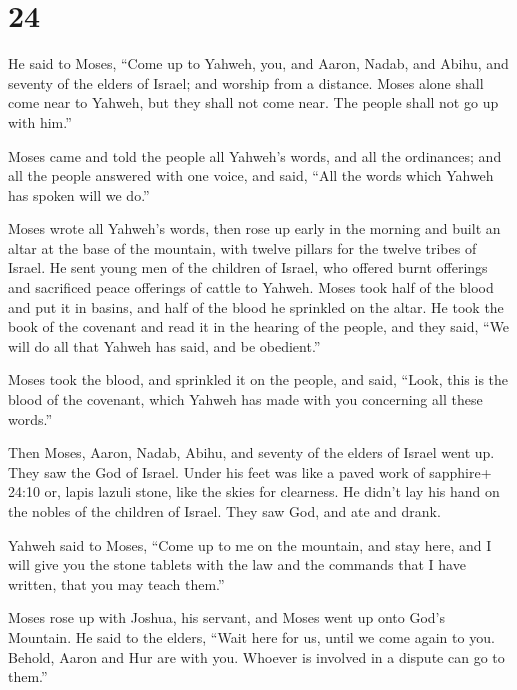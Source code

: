 \hypertarget{section-23}{%
\section{24}\label{section-23}}

 He said to Moses, ``Come up to Yahweh, you, and Aaron,
Nadab, and Abihu, and seventy of the elders of Israel; and worship from
a distance.  Moses alone shall come near to Yahweh, but they
shall not come near. The people shall not go up with him.''

 Moses came and told the people all Yahweh's words, and all
the ordinances; and all the people answered with one voice, and said,
``All the words which Yahweh has spoken will we do.''

 Moses wrote all Yahweh's words, then rose up early in the
morning and built an altar at the base of the mountain, with twelve
pillars for the twelve tribes of Israel.  He sent young men
of the children of Israel, who offered burnt offerings and sacrificed
peace offerings of cattle to Yahweh.  Moses took half of the
blood and put it in basins, and half of the blood he sprinkled on the
altar.  He took the book of the covenant and read it in the
hearing of the people, and they said, ``We will do all that Yahweh has
said, and be obedient.''

 Moses took the blood, and sprinkled it on the people, and
said, ``Look, this is the blood of the covenant, which Yahweh has made
with you concerning all these words.''

 Then Moses, Aaron, Nadab, Abihu, and seventy of the elders
of Israel went up.  They saw the God of Israel. Under his
feet was like a paved work of sapphire+ 24:10 or, lapis lazuli stone,
like the skies for clearness.  He didn't lay his hand on
the nobles of the children of Israel. They saw God, and ate and drank.

 Yahweh said to Moses, ``Come up to me on the mountain, and
stay here, and I will give you the stone tablets with the law and the
commands that I have written, that you may teach them.''

 Moses rose up with Joshua, his servant, and Moses went up
onto God's Mountain.  He said to the elders, ``Wait here
for us, until we come again to you. Behold, Aaron and Hur are with you.
Whoever is involved in a dispute can go to them.''

